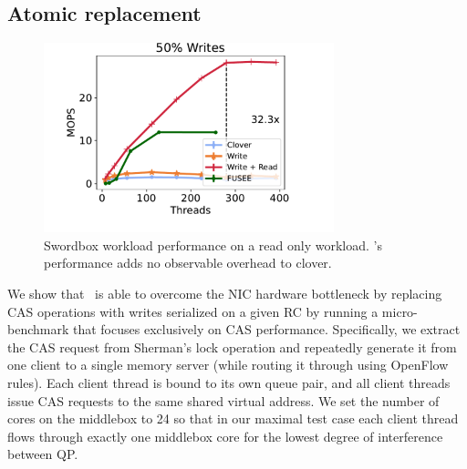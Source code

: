 
\subsection{Atomic replacement}



\begin{figure}
    \center
    \includegraphics[width=0.75\textwidth]{fig/full_system_performance-c.pdf}
    \caption{Swordbox workload performance on a read only workload. \sword's performance adds no observable overhead to clover.}
    \label{fig:full_system_performance-c}
\end{figure}



We show that \sword\ is able to overcome the NIC hardware
bottleneck by replacing CAS operations with writes
serialized on a given RC by running a micro-benchmark that
focuses exclusively on CAS performance. Specifically, we
extract the CAS request from Sherman's lock operation and
repeatedly generate it from one client to a single memory
server (while routing it through {\sword} using OpenFlow
rules).
Each client thread is bound to its own queue pair, and all
client threads issue CAS requests to the same shared virtual
address.  We set the number of cores on the {\sword}
middlebox to 24 so that in our maximal test case each client
thread flows through exactly one middlebox core for the
lowest degree of interference between QP.

